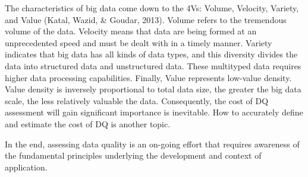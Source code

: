 \documentclass[pdftex,english,oribibl]{llncs}
\begin{document}
The characteristics of big data come down to the 4Vs: Volume, Velocity, Variety, and Value (Katal, Wazid, & Goudar, 2013). Volume refers to the tremendous volume of the data. Velocity means that data are being formed at an unprecedented speed and must be dealt with in a timely manner. Variety indicates that big data has all kinds of data types, and this diversity divides the data into structured data and unstructured data. These multityped data requires higher data processing capabilities.
Finally, Value represents low-value density. Value density is inversely proportional to total data size, the greater the big data scale, the less relatively valuable the data. Consequently, the cost of DQ assessment will gain significant importance is inevitable. How to accurately define and estimate the cost of DQ is another topic.

In the end, assessing data quality is an on-going effort that requires awareness of the fundamental principles underlying the development and context of application.


\end{document}
